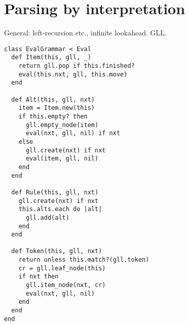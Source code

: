 
\section{Parsing by interpretation}

General: left-recursion etc., infinite lookahead. GLL. 


\begin{verbatim}
class EvalGrammar < Eval
  def Item(this, gll, _)
    return gll.pop if this.finished?
    eval(this.nxt, gll, this.move)
  end

  def Alt(this, gll, nxt)
    item = Item.new(this)
    if this.empty? then
      gll.empty_node(item)
      eval(nxt, gll, nil) if nxt
    else
      gll.create(nxt) if nxt
      eval(item, gll, nil)
    end
  end
  
  def Rule(this, gll, nxt)
    gll.create(nxt) if nxt
    this.alts.each do |alt|
      gll.add(alt)
    end
  end

  def Token(this, gll, nxt)
    return unless this.match?(gll.token)
    cr = gll.leaf_node(this)
    if nxt then
      gll.item_node(nxt, cr)
      eval(nxt, gll, nil)
    end
  end
end
\end{verbatim}

